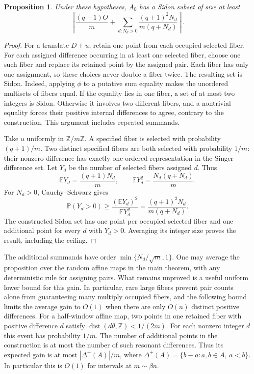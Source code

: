 \documentclass[11pt]{article}
\newtheorem{proposition}[theorem]{Proposition}
\theoremstyle{definition}
\theoremstyle{remark}
\newcommand{\Z}{\mathbb Z}
\begin{document}
\begin{proposition}\label{prop:fiber-matching}
Under these hypotheses, $A_0$ has a Sidon subset of size at least
\[
 \left\lceil\frac{(q+1)O}{m}
 +\sum_{d:N_d>0}\frac{(q+1)^2N_d}{m(q+N_d)}\right\rceil.
\]
\end{proposition}
\begin{proof}
For a translate $D+u$, retain one point from each occupied selected fiber.
For each assigned difference occurring in at least one selected fiber,
choose one such fiber and replace its retained point by the assigned pair.
Each fiber has only one assignment, so these choices never double a fiber
twice.  The resulting set is Sidon.  Indeed, applying $\phi$ to a putative
sum equality makes the unordered multisets of fibers equal.  If the equality
lies in one fiber, a set of at most two integers is Sidon.  Otherwise it
involves two different fibers, and a nontrivial equality forces their
positive internal differences to agree, contrary to the construction.
This argument includes repeated summands.

Take $u$ uniformly in $\mathbb Z/m\mathbb Z$.  A specified fiber is selected
with probability $(q+1)/m$.  Two distinct specified fibers are both selected
with probability $1/m$: their nonzero difference has exactly one ordered
representation in the Singer difference set.  Let $Y_d$ be the number of
selected fibers assigned $d$.  Thus
\[
 \mathbb EY_d=\frac{(q+1)N_d}{m},\qquad
 \mathbb EY_d^2=\frac{N_d(q+N_d)}m.
\]
For $N_d>0$, Cauchy--Schwarz gives
\[
 \mathbb P(Y_d>0)\ge
 \frac{(\mathbb EY_d)^2}{\mathbb EY_d^2}
 =\frac{(q+1)^2N_d}{m(q+N_d)}.
\]
The constructed Sidon set has one point per occupied selected fiber and
one additional point for every $d$ with $Y_d>0$.  Averaging its integer size
proves the result, including the ceiling.
\end{proof}

The additional summands have order $\min\{N_d/\sqrt m,1\}$.  One may average
the proposition over the random affine maps in the main theorem, with any
deterministic rule for assigning pairs.  What remains unproved is a useful
uniform lower bound for this gain.  In particular, rare large fibers prevent
pair counts alone from guaranteeing many multiply occupied fibers, and the following bound limits the average gain to $O(1)$ when there
are only $O(n)$ distinct positive differences. For a half-window affine
map, two points in one retained fiber with positive difference $d$
satisfy $\operatorname{dist}(d\theta,\Z)<1/(2m)$. For each nonzero
integer $d$ this event has probability $1/m$. The number of additional
points in the construction is at most the number of such resonant
differences. Thus its expected gain is at most $|\Delta^+(A)|/m$,
where $\Delta^+(A)=\{b-a:a,b\in A,\ a<b\}$. In particular this is
$O(1)$ for intervals at $m\sim\beta n$.
\end{document}
